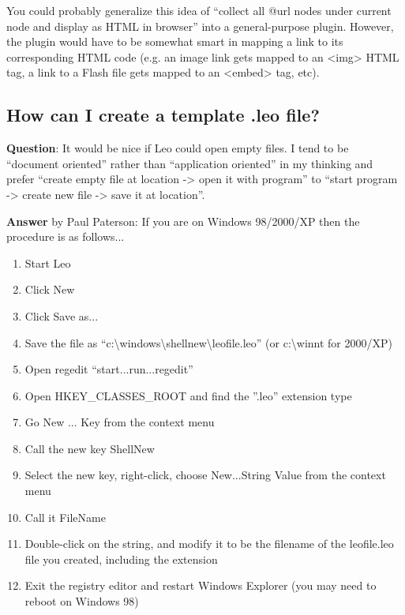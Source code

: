 \documentclass[a4paper,10pt,english]{sphinxmanual}
\begin{document}
You could probably generalize this idea of ``collect all @url nodes under current
node and display as HTML in browser'' into a general-purpose plugin. However,
the plugin would have to be somewhat smart in mapping a link to its corresponding
HTML code (e.g. an image link gets mapped to an \textless{}img\textgreater{} HTML tag, a link to a
Flash file gets mapped to an \textless{}embed\textgreater{} tag, etc).


\subsection{How can I create a template .leo file?}
\label{FAQ:how-can-i-create-a-template-leo-file}
\textbf{Question}:
It would be nice if Leo could open empty files. I tend to be ``document oriented''
rather than ``application oriented'' in my thinking and prefer ``create empty file
at location -\textgreater{} open it with program'' to ``start program -\textgreater{} create new file -\textgreater{}
save it at location''.

\textbf{Answer} by Paul Paterson:
If you are on Windows 98/2000/XP then the procedure is as follows...
\begin{enumerate}
\item {} 
Start Leo

\item {} 
Click New

\item {} 
Click Save as...

\item {} 
Save the file as ``c:\textbackslash{}windows\textbackslash{}shellnew\textbackslash{}leofile.leo'' (or c:\textbackslash{}winnt for 2000/XP)

\item {} 
Open regedit ``start...run...regedit''

\item {} 
Open HKEY\_CLASSES\_ROOT and find the ''.leo'' extension type

\item {} 
Go New ... Key from the context menu

\item {} 
Call the new key ShellNew

\item {} 
Select the new key, right-click, choose New...String Value from the context menu

\item {} 
Call it FileName

\item {} 
Double-click on the string, and modify it to be the filename of the leofile.leo file you created,
including the extension

\item {} 
Exit the registry editor and restart Windows Explorer (you may need to reboot on Windows 98)

\end{enumerate}
\end{document}
